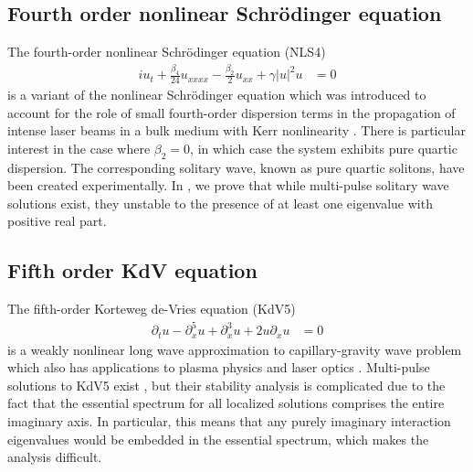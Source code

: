 \documentclass[12pt,reqno,oneside]{article}
\begin{document}
\subsection*{Fourth order nonlinear Schr\"odinger equation}

The fourth-order nonlinear Schr{\"o}dinger equation (NLS4) 
\begin{align*}
    i u_t + \frac{\beta_4}{24}u_{xxxx} - \frac{\beta_2}{2}u_{xx} + \gamma |u|^2 u &= 0 
\end{align*}
is a variant of the nonlinear Schr{\"o}dinger equation which was introduced to account for the role of small fourth-order dispersion terms in the propagation of intense laser beams in a bulk medium with Kerr nonlinearity \cite{Karpman2000,Tam2020}. There is particular interest in the case where $\beta_2 = 0$, in which case the system exhibits pure quartic dispersion. The corresponding solitary wave, known as pure quartic solitons, have been created experimentally. In \cite{Parker2020NLS4}, we prove that while multi-pulse solitary wave solutions exist, they unstable to the presence of at least one eigenvalue with positive real part.

\subsection*{Fifth order KdV equation}

The fifth-order Korteweg de-Vries equation (KdV5)
\begin{align*}
    \partial_t u - \partial_x^5 u + \partial_x^3 u + 2 u \partial_x u &= 0
\end{align*} 
is a weakly nonlinear long wave approximation to capillary-gravity wave problem which also has applications to plasma physics and laser optics \cite{Pelinovsky2007}. Multi-pulse solutions to KdV5 exist \cite{SandstedeStrut}, but their stability analysis is complicated due to the fact that the essential spectrum for all localized solutions comprises the entire imaginary axis. In particular, this means that any purely imaginary interaction eigenvalues would be embedded in the essential spectrum, which makes the analysis difficult.
\end{document}
